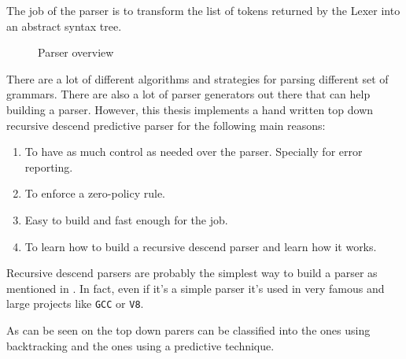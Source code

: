 The job of the parser is to transform the list of tokens returned by the Lexer into an abstract syntax tree.\\

\begin{figure}[H]
    \centering

    \caption{Parser overview}
    \label{fig:parser_overview}
\end{figure}

There are a lot of different algorithms and strategies for parsing different set of grammars.
There are also a lot of parser generators out there that can help building a parser. However, this thesis implements
a hand written top down recursive descend predictive parser for the following main reasons:

\begin{enumerate}
    \item To have as much control as needed over the parser. Specially for error reporting.
    \item To enforce a zero-policy rule.
    \item Easy to build and fast enough for the job.
    \item To learn how to build a recursive descend parser and learn how it works.
\end{enumerate}

Recursive descend parsers are probably the simplest way to build a parser as mentioned in \autocite[Section~6]{crafting_interpreters}.
In fact, even if it's a simple parser it's used in very famous and large projects like \texttt{GCC} or \texttt{V8}.

As can be seen on \autocite{top_down_parsing} the top down parers can be classified into the ones using backtracking and the ones using a predictive technique.


